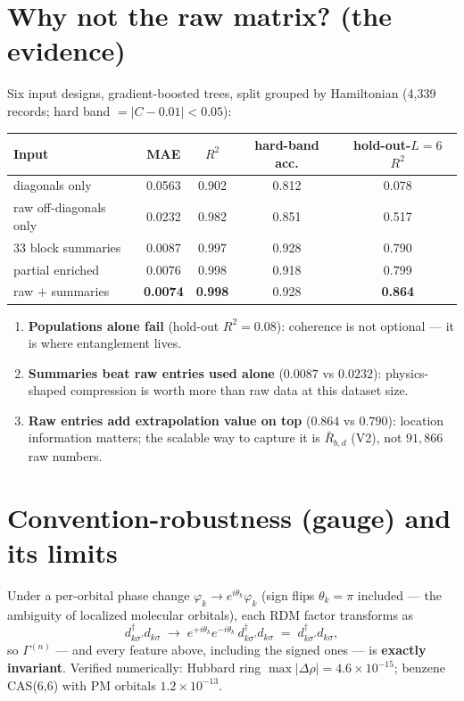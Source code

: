 \documentclass[11pt]{article}
\newcommand{\rdm}{\ensuremath{\Gamma^{(n)}}}
\begin{document}
\section{Why not the raw matrix? (the evidence)}\label{sec:evidence}
Six input designs, gradient-boosted trees, split grouped by Hamiltonian
(4{,}339 records; hard band $=|C-0.01|<0.05$):
\begin{center}
\small
\begin{tabular}{@{}lcccc@{}}
\toprule
Input & MAE & $R^2$ & hard-band acc. & hold-out-$L{=}6$ $R^2$ \\
\midrule
diagonals only          & 0.0563 & 0.902 & 0.812 & 0.078 \\
raw off-diagonals only  & 0.0232 & 0.982 & 0.851 & 0.517 \\
33 block summaries      & 0.0087 & 0.997 & 0.928 & 0.790 \\
partial enriched        & 0.0076 & 0.998 & 0.918 & 0.799 \\
raw $+$ summaries       & \textbf{0.0074} & \textbf{0.998} & 0.928
                        & \textbf{0.864} \\
\bottomrule
\end{tabular}
\end{center}
\begin{enumerate}[nosep]
  \item \textbf{Populations alone fail} (hold-out $R^2=0.08$): coherence is
        not optional --- it is where entanglement lives.
  \item \textbf{Summaries beat raw entries used alone} ($0.0087$ vs
        $0.0232$): physics-shaped compression is worth more than raw data at
        this dataset size.
  \item \textbf{Raw entries add extrapolation value on top} ($0.864$ vs
        $0.790$): location information matters; the scalable way to capture
        it is $\bar R_{b,d}$ (V2), not $91{,}866$ raw numbers.
\end{enumerate}

\section{Convention-robustness (gauge) and its limits}\label{sec:gauge}
Under a per-orbital phase change $\varphi_k\to e^{i\theta_k}\varphi_k$
(sign flips $\theta_k=\pi$ included --- the ambiguity of localized
molecular orbitals), each RDM factor transforms as
\[
  d^{\dagger}_{k\sigma'}d^{\phantom\dagger}_{k\sigma}
  \;\longrightarrow\;
  e^{+i\theta_k}e^{-i\theta_k}\,
  d^{\dagger}_{k\sigma'}d^{\phantom\dagger}_{k\sigma}
  \;=\;
  d^{\dagger}_{k\sigma'}d^{\phantom\dagger}_{k\sigma},
\]
so \rdm{} --- and every feature above, including the signed ones --- is
\textbf{exactly invariant}. Verified numerically: Hubbard ring
$\max|\Delta\rho|=4.6\times10^{-15}$; benzene CAS(6,6) with PM orbitals
$1.2\times10^{-13}$.
\end{document}
